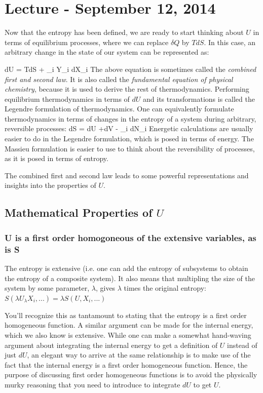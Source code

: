 \documentclass[12pt]{article}
\begin{document}
\section{Lecture - September 12, 2014}
Now that the entropy has been defined, we are ready to start thinking about $U$ in terms of equilibrium processes, where we can replace $\delta Q$ by $TdS$. In this case, an arbitrary change in the state of our system can be represented as:

\eqs
dU = TdS + \sum_i Y_i dX_i
\eqe
The above equation is sometimes called the \emph{combined first and second law}. It is also called the \emph{fundamental equation of physical chemistry}, because it is used to derive the rest of thermodynamics. Performing equilibrium thermodynamics in terms of $dU$ and its transformations is called the Legendre formulation of thermodynamics. One can equivalently formulate thermodynamics in terms of changes in the entropy of a system during arbitrary, reversible processes:
\eqs
dS = dU +dV - \sum_i dN_i
\eqe
Energetic calculations are usually easier to do in the Legendre formulation, which is posed in terms of energy. The Massieu formulation is easier to use to think about the reversibility of processes, as it is posed in terms of entropy.

The combined first and second law leads to some powerful representations and insights into the properties of $U$.

\subsection{Mathematical Properties of $U$}
\subsubsection{U is a first order homogoneous of the extensive variables, as is S}
The entropy is extensive (i.e. one can add the entropy of subsystems to obtain the entropy of a composite system). It also means that multipling the size of the system by some parameter, $\lambda$, gives $\lambda$ times the original entropy: 
$S(\lambda U_\lambda X_i,...)=\lambda S(U,X_i,...)$

You'll recognize this as tantamount to stating that the entropy is a first order homogeneous function. A similar argument can be made for the internal energy, which we also know is extensive. While one can make a somewhat hand-waving argument about integrating the internal energy to get a definition of $U$ instead of just $dU$, an elegant way to arrive at the same relationship is to make use of the fact that the internal energy is a first order homogeneous function. Hence, the purpose of discussing first order homogeneous functions is to avoid the physically murky reasoning that you need to introduce to integrate $dU$ to get $U$.
\end{document}
